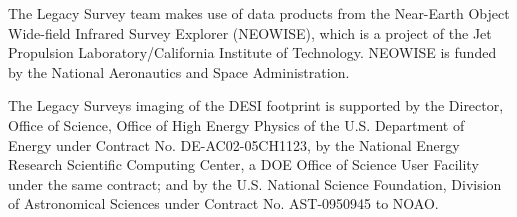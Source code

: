 \documentclass[fleqn,usenatbib]{mnras}
\begin{document}
The Legacy Survey team makes use of data products from the Near-Earth Object
Wide-field Infrared Survey Explorer (NEOWISE), which is a project of the Jet
Propulsion Laboratory/California Institute of Technology. NEOWISE is funded by
the National Aeronautics and Space Administration.

The Legacy Surveys imaging of the DESI footprint is supported by the Director,
Office of Science, Office of High Energy Physics of the U.S. Department of
Energy under Contract No. DE-AC02-05CH1123, by the National Energy Research
Scientific Computing Center, a DOE Office of Science User Facility under the
same contract; and by the U.S. National Science Foundation, Division of
Astronomical Sciences under Contract No. AST-0950945 to NOAO.






 \bsp	

\label{lastpage}
\end{document}
